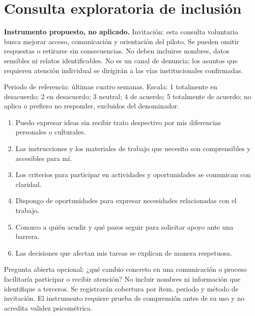 \documentclass[12pt,letterpaper,oneside]{article}
\begin{document}
\clearpage
\printbibliography[heading=bibintoc,title={Fuentes de información}]
\clearpage
\appendix
\section{Consulta exploratoria de inclusión}
\textbf{Instrumento propuesto, no aplicado.} Invitación: esta consulta voluntaria busca mejorar acceso, comunicación y orientación del piloto. Se pueden omitir respuestas o retirarse sin consecuencias. No deben incluirse nombres, datos sensibles ni relatos identificables. No es un canal de denuncia; los asuntos que requieren atención individual se dirigirán a las vías institucionales confirmadas.

Periodo de referencia: últimas cuatro semanas. Escala: 1 totalmente en desacuerdo; 2 en desacuerdo; 3 neutral; 4 de acuerdo; 5 totalmente de acuerdo; no aplica o prefiero no responder, excluidos del denominador.
\begin{enumerate}
\item Puedo expresar ideas sin recibir trato despectivo por mis diferencias personales o culturales.
\item Las instrucciones y los materiales de trabajo que necesito son comprensibles y accesibles para mí.
\item Los criterios para participar en actividades y oportunidades se comunican con claridad.
\item Dispongo de oportunidades para expresar necesidades relacionadas con el trabajo.
\item Conozco a quién acudir y qué pasos seguir para solicitar apoyo ante una barrera.
\item Las decisiones que afectan mis tareas se explican de manera respetuosa.
\end{enumerate}
Pregunta abierta opcional: ¿qué cambio concreto en una comunicación o proceso facilitaría participar o recibir atención? No incluir nombres ni información que identifique a terceros. Se registrarán cobertura por ítem, periodo y método de invitación. El instrumento requiere prueba de comprensión antes de su uso y no acredita validez psicométrica.
\end{document}
